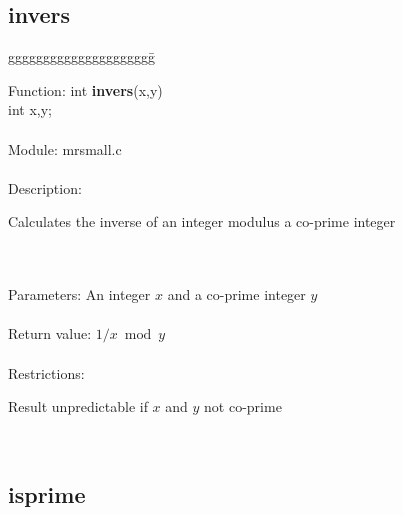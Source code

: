 \subsection{invers}

\begin{tabbing}
ggggggggggggggggggggg\= \kill

      Function:      \>int {\bf invers}(x,y) \\
                     \>int x,y; \\
      \ \\
      Module:        \>mrsmall.c \\
      \ \\
      Description:   \>
                     \parbox[t]{3 in}
                     {Calculates the inverse of an integer modulus a
                     co-prime integer}     \\
      \ \\
      Parameters:    \>An integer $x$ and a co-prime integer $y$  \\
      \ \\
      Return value:  \>$1/x \bmod y$  \\
      \ \\
      Restrictions:  \>
                     \parbox[t]{3 in}
                     {Result unpredictable if $x$ and $y$ not
                     co-prime}   \\

\end{tabbing}

\subsection{isprime}

